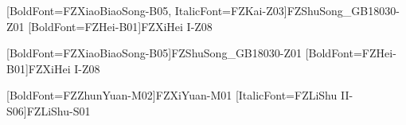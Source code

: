 
[BoldFont={FZXiaoBiaoSong-B05}, ItalicFont={FZKai-Z03}]{FZShuSong_GB18030-Z01} %
[BoldFont={FZHei-B01}]{FZXiHei I-Z08} %

[BoldFont={FZXiaoBiaoSong-B05}]{FZShuSong_GB18030-Z01} %
[BoldFont={FZHei-B01}]{FZXiHei I-Z08} %

[BoldFont={FZZhunYuan-M02}]{FZXiYuan-M01} %
[ItalicFont={FZLiShu II-S06}]{FZLiShu-S01} %

\def\heiti{\CJKfamily{hei}\bfseries}

